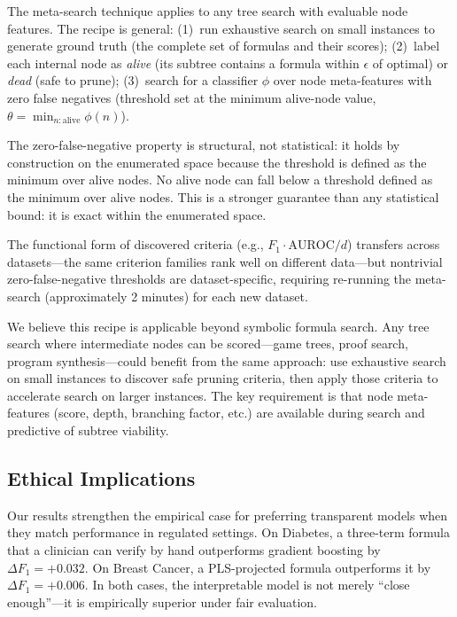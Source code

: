 \documentclass[journal]{IEEEtran}
\begin{document}
The meta-search technique applies to any tree search with evaluable
node features.  The recipe is general:
(1)~run exhaustive search on small instances to generate ground truth
(the complete set of formulas and their scores);
(2)~label each internal node as \emph{alive} (its subtree contains a
formula within $\epsilon$ of optimal) or \emph{dead} (safe to prune);
(3)~search for a classifier $\phi$ over node meta-features with zero
false negatives (threshold set at the minimum alive-node value,
$\theta = \min_{n:\text{alive}} \phi(n)$).

The zero-false-negative property is structural, not statistical:
it holds by construction on the enumerated space because the
threshold is defined as the minimum over alive nodes.  No alive
node can fall below a threshold defined as the minimum over alive
nodes.  This is a stronger guarantee than any statistical bound: it
is exact within the enumerated space.

The functional form of discovered criteria (e.g., $F_1 \cdot
\text{AUROC}/d$) transfers across datasets---the same criterion
families rank well on different data---but nontrivial
zero-false-negative thresholds are dataset-specific, requiring
re-running the meta-search (approximately 2 minutes) for each new
dataset.

We believe this recipe is applicable beyond symbolic formula search.
Any tree search where intermediate nodes can be scored---game trees,
proof search, program synthesis---could benefit from the same
approach: use exhaustive search on small instances to discover safe
pruning criteria, then apply those criteria to accelerate search on
larger instances.  The key requirement is that node meta-features
(score, depth, branching factor, etc.) are available during search
and predictive of subtree viability.

\subsection{Ethical Implications}
\label{sec:ethics}

Our results strengthen the empirical case for preferring transparent
models when they match performance in regulated settings.  On
Diabetes, a three-term formula that a clinician can verify by hand
outperforms gradient boosting by $\Delta F_1 = +0.032$.  On Breast
Cancer, a PLS-projected formula outperforms it by
$\Delta F_1 = +0.006$.  In both cases, the interpretable model is
not merely ``close enough''---it is empirically superior under fair
evaluation.
\end{document}
